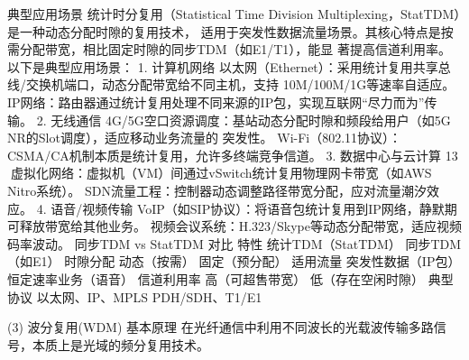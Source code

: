 典型应用场景
统计时分复用（Statistical Time Division Multiplexing，StatTDM）是一种动态分配时隙的复用技术，
适用于突发性数据流量场景。其核心特点是按需分配带宽，相比固定时隙的同步TDM（如E1/T1），能显
著提高信道利用率。以下是典型应用场景：
1. 计算机网络
以太网（Ethernet）：采用统计复用共享总线/交换机端口，动态分配带宽给不同主机，支持
10M/100M/1G等速率自适应。
IP网络：路由器通过统计复用处理不同来源的IP包，实现互联网“尽力而为”传输。
2. 无线通信
4G/5G空口资源调度：基站动态分配时隙和频段给用户（如5G NR的Slot调度），适应移动业务流量的
突发性。
Wi-Fi（802.11协议）：CSMA/CA机制本质是统计复用，允许多终端竞争信道。
3. 数据中心与云计算
                                                                   13
虚拟化网络：虚拟机（VM）间通过vSwitch统计复用物理网卡带宽（如AWS Nitro系统）。
SDN流量工程：控制器动态调整路径带宽分配，应对流量潮汐效应。
4. 语音/视频传输
VoIP（如SIP协议）：将语音包统计复用到IP网络，静默期可释放带宽给其他业务。
视频会议系统：H.323/Skype等动态分配带宽，适应视频码率波动。
同步TDM vs StatTDM 对比
特性                     统计TDM（StatTDM）        同步TDM（如E1）
时隙分配                   动态（按需）                固定（预分配）
适用流量                   突发性数据（IP包）            恒定速率业务（语音）
信道利用率                  高（可超售带宽）              低（存在空闲时隙）
典型协议                   以太网、IP、MPLS           PDH/SDH、T1/E1

(3) 波分复用(WDM)
基本原理
在光纤通信中利用不同波长的光载波传输多路信号，本质上是光域的频分复用技术。




